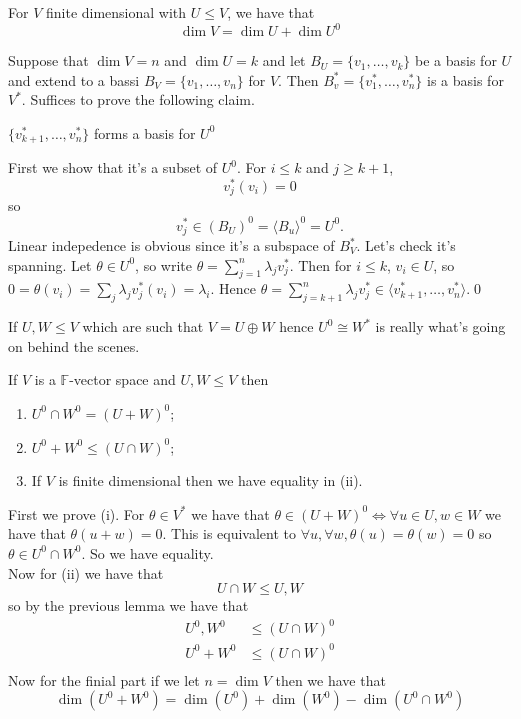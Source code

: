 \documentclass{article}
\newcommand{\F}{\mathbb{F}}
\begin{document}
\begin{proposition}
  For $ V $ finite dimensional with $ U\le V $, we have that
  \[
    \dim V=\dim U + \dim U^0
  \]
\end{proposition}
\pf Suppose that $ \dim V=n $ and $ \dim U=k $ and let $ B_U=\{v_1,\dots, v_k\} $ be a basis for $ U $ and extend to a bassi $ B_V=\{v_1,\dots, v_n\} $ for $ V $. Then $ B_v^*=\{v_1^*,\dots, v_n^*\} $ is a basis for $ V^* $. Suffices to prove the following claim.
\begin{claim}
	$ \{v^*_{k+1},\dots, v_n^* \}$ forms a basis for $ U^0 $
\end{claim} 
First we show that it's a subset of $ U^0 $. For $ i\le k $ and $ j\ge k+1 $,
\[
  v_j^*(v_i)=0
\]
so
\[
  v_j^*\in (B_U)^0=\langle B_u\rangle^0 = U^0.
\]
Linear indepedence is obvious since it's a subspace of $ B_V^* $. Let's check it's spanning. Let $ \theta\in U^0 $, so write $ \theta=\sum_{j=1}^n\lambda_jv_j^* $. Then for $ i\le k $, $ v_i\in U $, so $ 0=\theta(v_i)=\sum_j\lambda_jv_j^*(v_i)=\lambda_i $. Hence $ \theta=\sum_{j=k+1}^n\lambda_jv_j^*\in\langle v_{k+1}^*,\dots, v_n^*\rangle $.\qed
\begin{remark}
  If $ U,W\le V $ which are such that $ V=U\oplus W $ hence $ U^0\cong W^* $ is really what's going on behind the scenes.
\end{remark}
\begin{proposition}
  If $ V $ is a $ \F $-vector space  and $ U,W\le V $ then
  \begin{enumerate}
	  \item $ U^0\cap W^0=(U+W)^0 $;
	  \item $ U^0+W^0\le (U\cap W)^0 $;
	  \item If $ V $ is finite dimensional then we have equality in (ii).
  \end{enumerate}
\end{proposition}
\pf First we prove (i). For $ \theta\in V^* $ we have that $ \theta\in(U+W)^0 \iff \forall u\in U, w\in W $ we have that $ \theta(u+w)=0 $. This is equivalent to $ \forall u,\forall w, \theta(u)=\theta(w)=0 $ so $ \theta\in U^0\cap W^0 $. So we have equality.\\
Now for (ii) we have that
\[
  U\cap W\le U,W
\]
so by the previous lemma we have that
\begin{align*}
	U^0,W^0&\le (U\cap W)^0\\
	U^0+W^0&\le (U\cap W)^0\\
\end{align*}
Now for the finial part if we let $ n =\dim V $ then we have that \[
  \dim(U^0+W^0)=\dim(U^0)+\dim(W^0)-\dim(U^0\cap W^0)
\]
\end{document}
